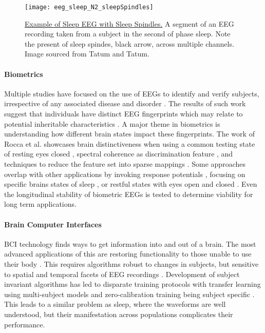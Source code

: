 \begin{figure}[h]
\centering
\texttt{[image: eeg\_sleep\_N2\_sleepSpindles]}
\caption[Example of Sleep EEG with Sleep Spindles]{\underline{Example of Sleep EEG with Sleep Spindles.} A segment of an \ac{EEG} recording taken from a subject in the second of phase sleep. Note the present of sleep spindes, black arrow, across multiple channels. Image sourced from Tatum and Tatum\cite{Tatum2014}.}
\label{fig:sleepExample}
\end{figure}

\paragraph*{Biometrics}
Multiple studies have focused on the use of \acp{EEG} to identify and verify subjects, irrespective of any associated disease and disorder \cite{DelPozo-Banos2014a}. The results of such work suggest that individuals have distinct \ac{EEG} fingerprints \cite{Tangkraingkij2010,Stassen1988,Doppelmayr1998a} which may relate to potential inheritable characteristics \cite{Stassen1988,VanBeijsterveldt2002}. A major theme in biometrics is understanding how different brain states impact these fingerprints. The work of Rocca et al. showcases brain distinctiveness when using a common testing state of resting eyes closed \cite{Rocca2012}, spectral coherence as discrimination feature \cite{Rocca2014}, and techniques to reduce the feature set into sparse mappings \cite{Rocca2013}. Some approaches overlap with other applications by invoking response potentials \cite{Brigham2010}, focusing on specific brains states of sleep \cite{DeGennaro2008}, or restful states with eyes open and closed \cite{Fraschini2015}. Even the longitudinal stability of biometric \acp{EEG} is tested \cite{Napflin2007} to determine viability for long term applications.

\paragraph*{Brain Computer Interfaces}
\ac{BCI} technology finds ways to get information into and out of a brain. The most advanced applications of this are restoring functionality to those unable to use their body \cite{Ajiboye2017,Gouy-Pailler2008a}. This requires algorithms robust to changes in subjects, but sensitive to spatial and temporal facets of \ac{EEG} recordings \cite{Kindermans2014b,Blankertz2007a}. Development of subject invariant algorithms has led to disparate training protocols with transfer learning using multi-subject models \cite{Lotte2010a} and zero-calibration training being subject specific \cite{Kindermans2014}. This leads to a similar problem as sleep, where the waveforms are well understood, but their manifestation across populations complicates their performance.

